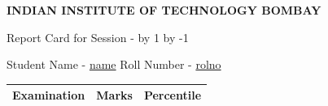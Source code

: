 \documentclass{article}
\newcommand\NextYear{%
  \advance\year by 1 \the\year\advance\year by -1}
\begin{document}
    \begin{center}
        \begin{huge}
            \textbf {INDIAN INSTITUTE OF TECHNOLOGY BOMBAY}

            Report Card for Session \the \year -\NextYear

        \end{huge}
    \end{center}
    \begin{Large}
        \begin{center}
            Student Name - \underline{name} \hspace{1cm} Roll Number - \underline{rolno}\\
        \end{center}
    \begin{center}
    \begin{tabular}[center , width=\pagewidth]{|c|c|c|}
        \hline
        Examination & Marks & Percentile \\ \hline
    \end{tabular}
    \end{center}
    \end{Large}
    \begin{center}
    \end{center}
    
\end{document}
